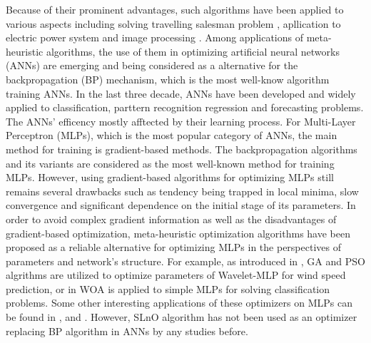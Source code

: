 \documentclass[../main.tex]{subfiles}
\begin{document}
Because of their prominent advantages, such algorithms have been applied to various aspects including solving travelling salesman problem \cite{wang2003particle}, apllication to electric power system \cite{yuan2004survey} and image processing \cite{karmakar2002generic} \cite{hore2011edge}. Among applications of meta-heuristic algorithms, the use of them in optimizing artificial neural networks (ANNs) are emerging and being considered as a alternative for the backpropagation (BP) mechanism, which is the most well-know algorithm training ANNs. In the last three decade, ANNs have been developed and widely applied to classification, parttern recognition regression and forecasting problems. The ANNs' efficency mostly afftected by their learning process. For Multi-Layer Perceptron (MLPs), which is the most popular category of ANNs, the main method for training is gradient-based methods. The backpropagation algorithms and its variants \cite{ruder2016overview} are considered as the most well-known method for training MLPs. However, using gradient-based algorithms for optimizing MLPs still remains several drawbacks such as tendency being trapped in local minima, slow convergence and significant dependence on the initial stage of its parameters. In order to avoid complex gradient information as well as the disadvantages of gradient-based optimization, meta-heuristic optimization algorithms have been proposed as a reliable alternative for optimizing MLPs in the perspectives of parameters and network's structure. For example, as introduced in \cite{liu2013experimental}, GA and PSO algrithms are utilized to optimize parameters of Wavelet-MLP for wind speed prediction, or in \cite{aljarah2018optimizing} WOA is applied to simple MLPs for solving classification problems. Some other interesting applications of these optimizers on MLPs can be found in \cite{castillo2000g}, \cite{nasseri2008optimized} and \cite{kawam2012metaheuristic}. However, SLnO algorithm has not been used as an optimizer replacing BP algorithm in ANNs by any studies before.
\end{document}
